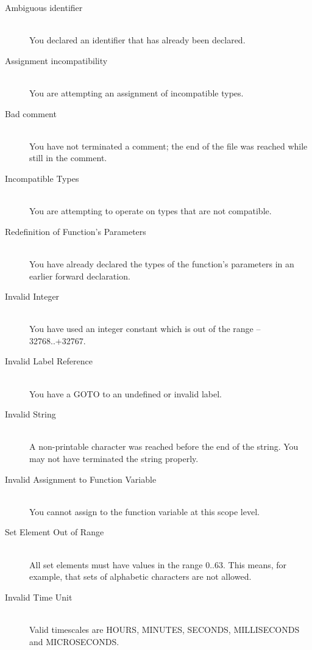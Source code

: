 \begin{description}
\item[Ambiguous identifier]\mbox{}\\
You declared an identifier that has already been declared.

\item[Assignment incompatibility]\mbox{}\\
You are attempting an assignment of incompatible types.

\item[Bad comment]\mbox{}\\
You have not terminated a comment; the end of the file was reached
while still in the comment.

\item[Incompatible Types]\mbox{}\\
You are attempting to operate on types that are not compatible.

\item[Redefinition of Function's Parameters]\mbox{}\\
You have already declared the types of the function's parameters in
an earlier forward declaration.

\item[Invalid Integer]\mbox{}\\
You have used an integer constant which is out of the range --32768..+32767.

\item[Invalid Label Reference]\mbox{}\\
You have a GOTO to an undefined or invalid label.

\item[Invalid String]\mbox{}\\
A non-printable character was reached before the end of the string.
You may not have terminated the string properly.

\item[Invalid Assignment to Function Variable]\mbox{}\\
You cannot assign to the function variable at this scope level.

\item[Set Element Out of Range]\mbox{}\\
All set elements must have values in the range 0..63. This means,
for example, that sets of alphabetic characters are not allowed.

\item[Invalid Time Unit]\mbox{}\\
Valid timescales are HOURS, MINUTES, SECONDS, MILLISECONDS and
MICROSECONDS.


\end{description}
